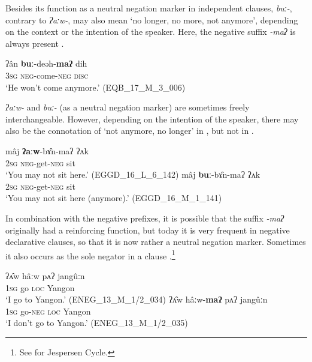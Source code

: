 \documentclass[output=paper,colorlinks,citecolor=brown]{langscibook}
\begin{document}
Besides its function as a neutral negation marker in independent clauses, \textit{buː{}-}, contrary to \textit{ʔaːw-}, may also mean ‘no longer, no more, not anymore’, depending on the context or the intention of the speaker. Here, the negative suffix \textit{{}-maʔ} is always present .

\ea\label{ex:rum:5}
    \gll ʔân	\textbf{buː}-deəh-\textbf{maʔ}	dih\\
         3\textsc{sg} \textsc{neg}{}-come-\textsc{neg} \textsc{disc} \\
    \glt ‘He won’t come anymore.’ (EQB\_17\_M\_3\_006)
\z    

\textit{ʔaːw-} and \textit{buː{}-} (as a neutral negation marker) are sometimes freely interchangeable. However, depending on the intention of the speaker, there may also be the connotation of ‘not anymore, no longer’ in , but not in .

\ea\label{ex:rum:6}
    \ea\label{ex:rum:6a}
        \gll mâj	\textbf{ʔaːw}-bɤ̂n-maʔ	ʔʌk \\ 
             2\textsc{sg} \textsc{neg}{}-get-\textsc{neg} sit \\
        \glt ‘You may not sit here.’ (EGGD\_16\_L\_6\_142)
    \ex\label{ex:rum:6b}
        \gll mâj	\textbf{buː}-bɤ̂n-maʔ	ʔʌk \\
             2\textsc{sg} \textsc{neg}{}-get-\textsc{neg} sit \\
        \glt ‘You may not sit here (anymore).’ (EGGD\_16\_M\_1\_141)
    \z
\z 

In combination with the negative prefixes, it is possible that the suffix \textit{{}-maʔ} originally had a reinforcing function, but today it is very frequent in negative declarative clauses, so that it is now rather a neutral negation marker. Sometimes it also occurs as the sole negator in a clause .\footnote{See  for Jespersen Cycle.}

\ea\label{ex:rum:7}
    \ea\label{ex:rum:7a}
        \gll ʔʌ̂w	hâːw	pʌʔ	jangûːn \\ 
             1\textsc{sg} go \textsc{loc} Yangon \\
        \glt ‘I go to Yangon.’ (ENEG\_13\_M\_1/2\_034)
    \ex\label{ex:rum:7b}
        \gll ʔʌ̂w	hâːw-\textbf{maʔ} pʌʔ	jangûːn \\
              1\textsc{sg} go-\textsc{neg} \textsc{loc} Yangon \\
        \glt ‘I don’t go to Yangon.’ (ENEG\_13\_M\_1/2\_035)
    \z
\z 
\end{document}
